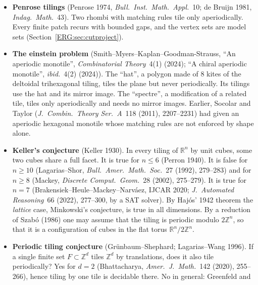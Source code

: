 \documentclass[11pt,openany]{book}
\theoremstyle{plain}
\theoremstyle{definition}
\theoremstyle{remark}
\newcommand{\R}{\mathbb{R}}
\newcommand{\Z}{\mathbb{Z}}
\begin{document}
\begin{itemize}[leftmargin=1.2em,itemsep=0.45em]
  Robinson, \emph{Invent.\ Math.}~12 (1971)). It is undecidable whether a finite set of Wang tiles (unit
  squares with coloured edges, matched edge to edge, no rotations) tiles the plane. The proof needs, and
  produces, an \emph{aperiodic} tile set: one that tiles, but only non-periodically. Berger used $20426$
  tiles, and Robinson used $6$ tiles (allowing rotations and reflections). The minimum is $11$ Wang tiles, on $4$ colours (Jeandel--Rao,
  \emph{Advances in Combinatorics} 2021).
\item \textbf{Penrose tilings} (Penrose 1974, \emph{Bull.\ Inst.\ Math.\ Appl.}~10; de Bruijn 1981,
  \emph{Indag.\ Math.}~43). Two rhombi with matching rules tile only aperiodically. Every finite patch
  recurs with bounded gaps, and the vertex sets are model sets (Section~\ref{ERG:sec:cutproject}).
\item \textbf{The einstein problem} (Smith--Myers--Kaplan--Goodman-Strauss, ``An aperiodic monotile'',
  \emph{Combinatorial Theory}~4(1) (2024); ``A chiral aperiodic monotile'', \emph{ibid.}~4(2) (2024)). The
  ``hat'', a polygon made of $8$ kites of the deltoidal trihexagonal tiling, tiles the plane but never
  periodically. Its tilings use the hat and its mirror image. The ``spectre'', a modification of a related
  tile, tiles only aperiodically and needs no mirror images. Earlier, Socolar and Taylor (\emph{J.\ Combin.\ Theory Ser.~A}~118 (2011), 2207--2231) had
  given an aperiodic hexagonal monotile whose matching rules are not enforced by shape alone.
\item \textbf{Keller's conjecture} (Keller 1930). In every tiling of $\R^n$ by unit cubes, some two cubes
  share a full facet. It is true for $n\le6$ (Perron 1940). It is false for $n\ge10$ (Lagarias--Shor,
  \emph{Bull.\ Amer.\ Math.\ Soc.}~27 (1992), 279--283) and for $n\ge8$ (Mackey, \emph{Discrete Comput.\
  Geom.}~28 (2002), 275--279). It is true for $n=7$ (Brakensiek--Heule--Mackey--Narv\'aez, IJCAR 2020;
  \emph{J.\ Automated Reasoning}~66 (2022), 277--300, by a SAT solver). By Haj\'os' 1942 theorem the
  \emph{lattice} case, Minkowski's conjecture, is true in all dimensions. By a reduction of Szab\'o (1986)
  one may assume that the tiling is periodic modulo $2\Z^n$, so that it is a configuration of cubes in the
  flat torus $\R^n/2\Z^n$.
\item \textbf{Periodic tiling conjecture} (Grünbaum--Shephard; Lagarias--Wang 1996). If a single finite set
  $F\subset\Z^d$ tiles $\Z^d$ by translations, does it also tile periodically? Yes for $d=2$ (Bhattacharya,
  \emph{Amer.\ J.\ Math.}~142 (2020), 255--266), hence tiling by one tile is decidable there. No in general: Greenfeld and

\end{itemize}
\end{document}
